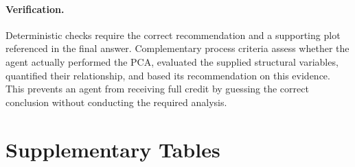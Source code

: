 \documentclass[11pt,a4paper]{article}
\begin{document}
\paragraph{Verification.}
Deterministic checks require the correct recommendation and a supporting plot referenced in the final answer. Complementary process criteria assess whether the agent actually performed the PCA, evaluated the supplied structural variables, quantified their relationship, and based its recommendation on this evidence. This prevents an agent from receiving full credit by guessing the correct conclusion without conducting the required analysis.

\section{Supplementary Tables}
\end{document}
